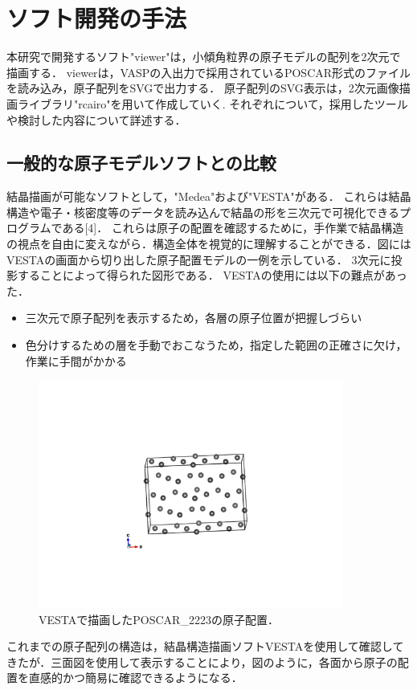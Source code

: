 
\section{ソフト開発の手法}
本研究で開発するソフト"viewer"は，小傾角粒界の原子モデルの配列を2次元で描画する．
viewerは，VASPの入出力で採用されているPOSCAR形式のファイルを読み込み，原子配列をSVGで出力する．
原子配列のSVG表示は，2次元画像描画ライブラリ"rcairo"を用いて作成していく.
それぞれについて，採用したツールや検討した内容について詳述する．

\subsection{一般的な原子モデルソフトとの比較}
結晶描画が可能なソフトとして，"Medea"および"VESTA"がある．
これらは結晶構造や電子・核密度等のデータを読み込んで結晶の形を三次元で可視化できるプログラムである[4]．
これらは原子の配置を確認するために，手作業で結晶構造の視点を自由に変えながら．構造全体を視覚的に理解することができる．図にはVESTAの画面から切り出した原子配置モデルの一例を示している．
3次元に投影することによって得られた図形である．
VESTAの使用には以下の難点があった．

\begin{itemize}
\item 三次元で原子配列を表示するため，各層の原子位置が把握しづらい
\item 色分けするための層を手動でおこなうため，指定した範囲の正確さに欠け，作業に手間がかかる
\end{itemize}
\begin{figure}[htbp]\begin{center}
\includegraphics[width=10cm,bb= 0 0 737 553]{../figs/./boundary_narita.006.jpeg}
\caption{VESTAで描画したPOSCAR\_2223の原子配置．}
\label{default}\end{center}\end{figure}
これまでの原子配列の構造は，結晶構造描画ソフトVESTAを使用して確認してきたが．三面図を使用して表示することにより，図のように，各面から原子の配置を直感的かつ簡易に確認できるようになる．

